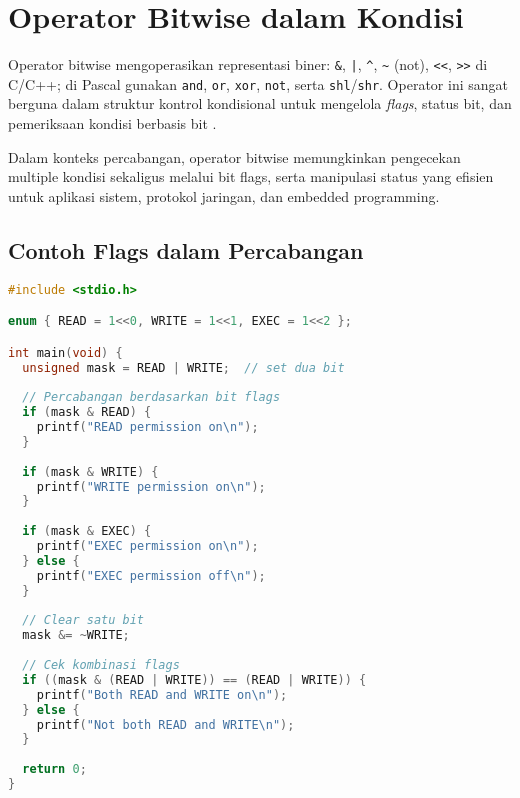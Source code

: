 \documentclass[../main.tex]{subfiles}
\begin{document}
\section{Operator Bitwise dalam Kondisi}
Operator bitwise mengoperasikan representasi biner: \texttt{\&}, \texttt{|}, \texttt{\^{}}, \texttt{\~{}} (not), \texttt{\textless\textless}, \texttt{\textgreater\textgreater} di C/C++; di Pascal gunakan \texttt{and}, \texttt{or}, \texttt{xor}, \texttt{not}, serta \texttt{shl}/\texttt{shr}. Operator ini sangat berguna dalam struktur kontrol kondisional untuk mengelola \emph{flags}, status bit, dan pemeriksaan kondisi berbasis bit \parencite{free-pascal-docs,iso-c-draft-n1570,cpp-reference}.

Dalam konteks percabangan, operator bitwise memungkinkan pengecekan multiple kondisi sekaligus melalui bit flags, serta manipulasi status yang efisien untuk aplikasi sistem, protokol jaringan, dan embedded programming.

\subsection{Contoh Flags dalam Percabangan}
\begin{lstlisting}[language=C, caption={Bit flags dengan kondisi di C}]
#include <stdio.h>

enum { READ = 1<<0, WRITE = 1<<1, EXEC = 1<<2 };

int main(void) {
  unsigned mask = READ | WRITE;  // set dua bit
  
  // Percabangan berdasarkan bit flags
  if (mask & READ) {
    printf("READ permission on\n");
  }
  
  if (mask & WRITE) {
    printf("WRITE permission on\n");
  }
  
  if (mask & EXEC) {
    printf("EXEC permission on\n");
  } else {
    printf("EXEC permission off\n");
  }
  
  // Clear satu bit
  mask &= ~WRITE;
  
  // Cek kombinasi flags
  if ((mask & (READ | WRITE)) == (READ | WRITE)) {
    printf("Both READ and WRITE on\n");
  } else {
    printf("Not both READ and WRITE\n");
  }
  
  return 0;
}
\end{lstlisting}
\end{document}
